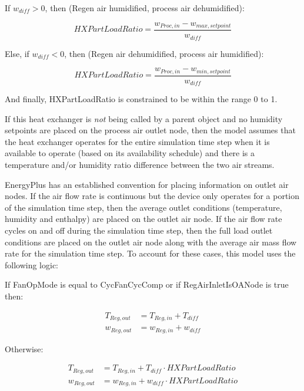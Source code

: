 If $w_{diff}>0$, then (Regen air humidified, process air dehumidified):

\begin{equation}
  HXPartLoadRatio = \frac{w_{Proc,in} - w_{max,setpoint}}{w_{diff}}
\end{equation}

Else, if $w_{diff} <0$, then (Regen air dehumidified, process air humidified):

\begin{equation}
  HXPartLoadRatio = \frac{w_{Proc,in} - w_{min,setpoint}}{w_{diff}}
\end{equation}

And finally, HXPartLoadRatio is constrained to be within the range 0 to 1.

If this heat exchanger is \emph{not} being called by a parent object and no humidity setpoints are placed on the process air outlet node, then the model assumes that the heat exchanger operates for the entire simulation time step when it is available to operate (based on its availability schedule) and there is a temperature and/or humidity ratio difference between the two air streams.

EnergyPlus has an established convention for placing information on outlet air nodes. If the air flow rate is continuous but the device only operates for a portion of the simulation time step, then the average outlet conditions (temperature, humidity and enthalpy) are placed on the outlet air node. If the air flow rate cycles on and off during the simulation time step, then the full load outlet conditions are placed on the outlet air node along with the average air mass flow rate for the simulation time step. To account for these cases, this model uses the following logic:

If FanOpMode is equal to CycFanCycComp or if RegAirInletIsOANode is true then:

\begin{equation}
  \begin{array}{rl}
    T_{Reg,out} &= T_{Reg,in} + T_{diff} \\
    w_{Reg,out} &= w_{Reg,in} + w_{diff}
  \end{array}
\end{equation}

Otherwise:

\begin{equation}
  \begin{array}{rl}
    T_{Reg,out} &= T_{Reg,in} + T_{diff} \cdot HXPartLoadRatio \\
    w_{Reg,out} &= w_{Reg,in} + w_{diff} \cdot HXPartLoadRatio
  \end{array}
\end{equation}

